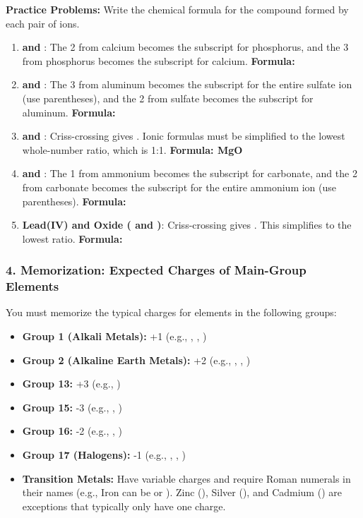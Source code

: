 \documentclass{article}
\begin{document}
\textbf{Practice Problems:} Write the chemical formula for the compound formed by each pair of ions.
\begin{enumerate}[itemsep=5pt]
    \item \textbf{ and }: The 2 from calcium becomes the subscript for phosphorus, and the 3 from phosphorus becomes the subscript for calcium. \textbf{Formula: }
    \item \textbf{ and }: The 3 from aluminum becomes the subscript for the entire sulfate ion (use parentheses), and the 2 from sulfate becomes the subscript for aluminum. \textbf{Formula: }
    \item \textbf{ and }: Criss-crossing gives . Ionic formulas must be simplified to the lowest whole-number ratio, which is 1:1. \textbf{Formula: MgO}
    \item \textbf{ and }: The 1 from ammonium becomes the subscript for carbonate, and the 2 from carbonate becomes the subscript for the entire ammonium ion (use parentheses). \textbf{Formula: }
    \item \textbf{Lead(IV) and Oxide ( and )}: Criss-crossing gives . This simplifies to the lowest ratio. \textbf{Formula: }
\end{enumerate}

\bigskip
\subsubsection*{4. Memorization: Expected Charges of Main-Group Elements}
You must memorize the typical charges for elements in the following groups:
\begin{itemize}[itemsep=5pt]
    \item \textbf{Group 1 (Alkali Metals):} +1 (e.g., , , )
    \item \textbf{Group 2 (Alkaline Earth Metals):} +2 (e.g., , , )
    \item \textbf{Group 13:} +3 (e.g., )
    \item \textbf{Group 15:} -3 (e.g., , )
    \item \textbf{Group 16:} -2 (e.g., , )
    \item \textbf{Group 17 (Halogens):} -1 (e.g., , , )
    \item \textbf{Transition Metals:} Have variable charges and require Roman numerals in their names (e.g., Iron can be  or ). Zinc (), Silver (), and Cadmium () are exceptions that typically only have one charge.
\end{itemize}
\end{document}
